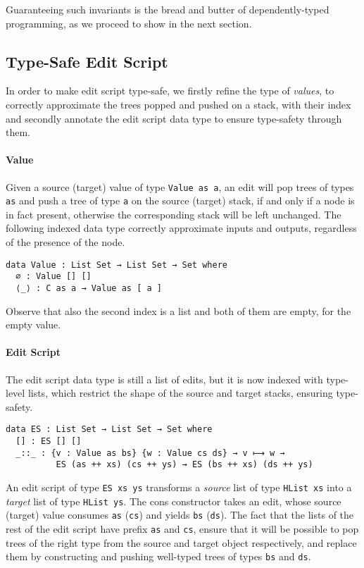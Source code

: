 \documentclass{sigplanconf}
\theoremstyle{plain}
\begin{document}
%
Guaranteeing such invariants is the bread and butter of
dependently-typed programming, as we proceed to show in the next
section.

\subsection{Type-Safe Edit Script}
In order to make edit script type-safe, we firstly refine the type of
\emph{values}, to correctly approximate the trees popped and pushed on
a stack, with their index and secondly annotate the edit script data
type to ensure type-safety through them.

\paragraph{Value}
Given a source (target) value of type \texttt{Value as a}, an edit
will pop trees of types \texttt{as} and push a tree of type \texttt{a}
on the source (target) stack, if and only if a node is in fact
present, otherwise the corresponding stack will be left unchanged.
%
The following indexed data type correctly approximate inputs and
outputs, regardless of the presence of the node.
\begin{verbatim}
data Value : List Set → List Set → Set where
  ∅ : Value [] []
  ⟨_⟩ : C as a → Value as [ a ] 
\end{verbatim}
Observe that also the second index is a list and both of them are
empty, for the empty value.
%

\paragraph{Edit Script}
The edit script data type is still a list of edits, but it is now
indexed with type-level lists, which restrict the shape of the source
and target stacks, ensuring type-safety.
%
\begin{verbatim}
data ES : List Set → List Set → Set where
  [] : ES [] []
  _::_ : {v : Value as bs} {w : Value cs ds} → v ⟼ w → 
          ES (as ++ xs) (cs ++ ys) → ES (bs ++ xs) (ds ++ ys)
\end{verbatim}	
An edit script of type \texttt{ES xs ys} transforms a \emph{source}
list of type \texttt{HList xs} into a \emph{target} list of type
\texttt{HList ys}.  
%
The cons constructor takes an edit, whose source (target) value
consumes \texttt{as} (\texttt{cs}) and yields \texttt{bs}
(\texttt{ds}).
%
The fact that the lists of the rest of the edit script have prefix
\texttt{as} and \texttt{cs}, ensure that it will be possible to pop
trees of the right type from the source and target object
respectively, and replace them by constructing and pushing well-typed
trees of types \texttt{bs} and \texttt{ds}.
\end{document}
